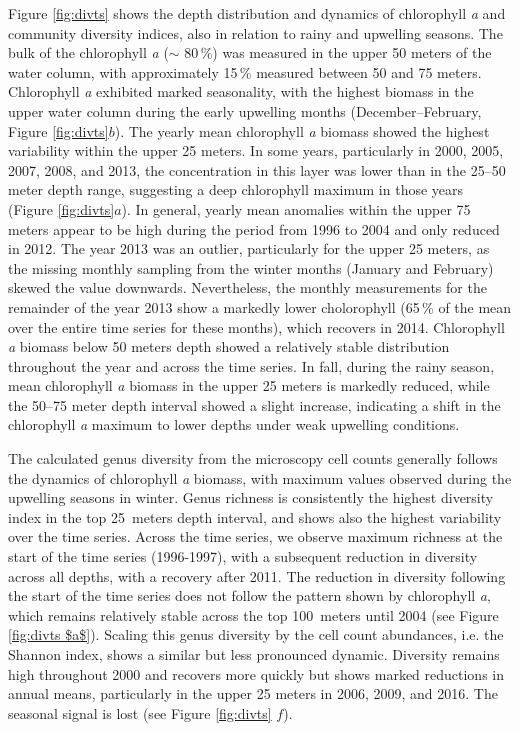 \documentclass[draft]{agujournal2019}
\begin{document}
Figure \ref{fig:divts} shows the depth distribution and dynamics of chlorophyll \textit{a} and community diversity indices, also in relation to rainy and upwelling seasons. The bulk of the chlorophyll \textit{a} ($\sim$ 80\,\%) was measured in the upper 50 meters of the water column, with approximately 15\,\% measured between 50 and 75 meters. Chlorophyll \textit{a} exhibited marked seasonality, with the highest biomass in the upper water column during the early upwelling months (December–February, Figure \ref{fig:divts}$b$). The yearly mean chlorophyll \textit{a} biomass showed the highest variability within the upper 25 meters. In some years, particularly in 2000, 2005, 2007, 2008, and 2013, the concentration in this layer was lower than in the 25–50 meter depth range, suggesting a deep chlorophyll maximum in those years (Figure \ref{fig:divts}$a$). In general, yearly mean anomalies within the upper 75 meters appear to be high during the period from 1996 to 2004 and only reduced in 2012. The year 2013 was an outlier, particularly for the upper 25 meters, as the missing monthly sampling from the winter months (January and February) skewed the value downwards. Nevertheless, the monthly measurements for the remainder of the year 2013 show a markedly lower cholorophyll (65\,\% of the mean over the entire time series for these months), which recovers in 2014. Chlorophyll \textit{a} biomass below 50 meters depth showed a relatively stable distribution throughout the year and across the time series. In fall, during the rainy season, mean chlorophyll \textit{a} biomass in the upper 25 meters is markedly reduced, while the 50–75 meter depth interval showed a slight increase, indicating a shift in the chlorophyll \textit{a} maximum to lower depths under weak upwelling conditions.

The calculated genus diversity from the microscopy cell counts generally follows the dynamics of chlorophyll \textit{a} biomass, with maximum values observed during the upwelling seasons in winter. Genus richness is consistently the highest diversity index in the top \qty{25}{meters} depth interval, and shows also the highest variability over the time series. Across the time series, we observe maximum richness at the start of the time series (1996-1997), with a subsequent reduction in diversity across all depths, with a recovery after 2011. The  reduction in diversity following the start of the time series does not follow the pattern shown by chlorophyll \textit{a}, which remains relatively stable across the top \qty{100}{meters} until 2004 (see Figure \ref{fig:divts $a$}). Scaling this genus diversity by the cell count abundances, i.e. the Shannon index, shows a similar but less pronounced dynamic. Diversity remains high throughout 2000 and recovers more quickly but shows marked reductions in annual means, particularly in the upper 25 meters in 2006, 2009, and 2016. The seasonal signal is lost (see Figure \ref{fig:divts} $f$). 
\end{document}
